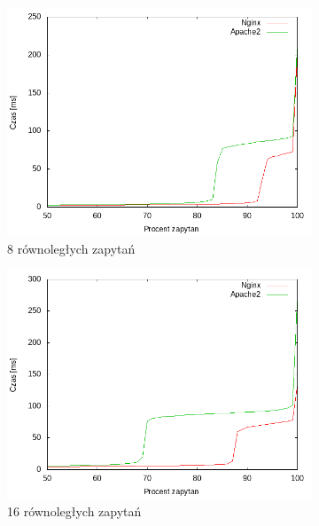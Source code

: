 \begin{figure}
	\begin{subfigure}[h]{0.3\textwidth}
		\includegraphics[width=\textwidth]{testy/wybor_index_maly_8.png}
		\caption{8 równoległych zapytań}
	\end{subfigure}
	\begin{subfigure}[h]{0.3\textwidth}
		\includegraphics[width=\textwidth]{testy/wybor_index_maly_16.png}
		\caption{16 równoległych zapytań}
	\end{subfigure}
	\begin{subfigure}[h]{0.3\textwidth}

\end{subfigure}
\end{figure}
